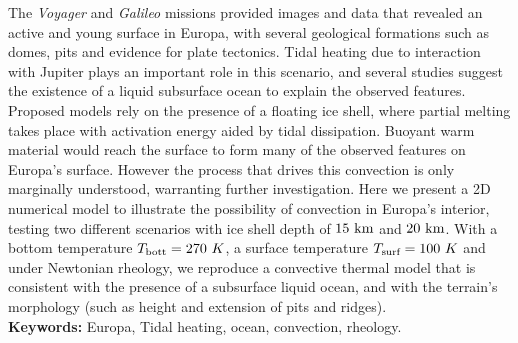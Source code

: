 The \textit{Voyager} and \textit{Galileo} missions provided images and data that revealed an active and
young surface in Europa, with several geological formations such as domes, pits and
evidence for plate tectonics. 
Tidal heating due to 
interaction with Jupiter plays an important 
role in this scenario, and several studies suggest the existence of a liquid subsurface ocean to explain the observed 
features. Proposed models rely on the presence of a floating ice shell, 
where partial melting takes place with activation energy aided by tidal dissipation. Buoyant warm material would reach the surface to form many of the observed features on Europa's surface. However the process that drives this convection is only marginally understood, warranting further investigation. Here we present a 2D numerical model to illustrate 
the possibility of convection in Europa's interior, testing two different scenarios with ice shell depth of $15 \ \textup{km} $ and $20 \ \textup{km}$. With a bottom temperature $T_{\textup{bott}} = 270 \ K$, 
a surface temperature $T_{\textup{surf}} = 100 \ K$ and under Newtonian rheology, we reproduce 
a convective thermal model that is consistent with the presence of a subsurface liquid ocean, and with the terrain's morphology (such as height and extension of pits and ridges). 
\\
\textbf{Keywords:} Europa, Tidal heating, ocean, convection, rheology. 
